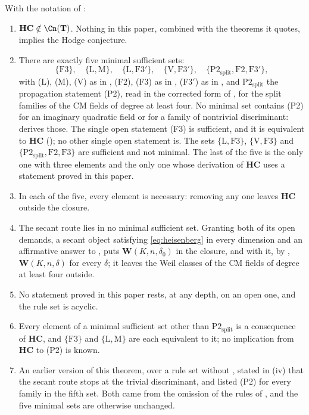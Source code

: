 \begin{theorem}\label{thm:closure}
With the notation of :
\begin{enumerate}[label=\textup{(\roman*)},leftmargin=2.6em]
\item $\mathbf{HC}\notin\Cn(\mathbf{T})$. Nothing in this paper, combined with the
  theorems it quotes, implies the Hodge conjecture.
\item There are exactly five minimal sufficient sets:
  \[
    \{\mathrm{F3}\},\quad\{\mathrm{L},\mathrm{M}\},\quad
    \{\mathrm{L},\mathrm{F3}'\},\quad\{\mathrm{V},\mathrm{F3}'\},\quad
    \{\mathrm{P2}_{\mathrm{split}},\mathrm{F2},\mathrm{F3}'\},
  \]
  with \textup{(L)}, \textup{(M)}, \textup{(V)} as in ,
  \textup{(F2)}, \textup{(F3)} as in , (F3$'$) as in
  , and $\mathrm{P2}_{\mathrm{split}}$ the propagation
  statement \textup{(P2)}, read in the corrected form of ,
  for the split families of the CM fields of degree at least four. No
  minimal set contains \textup{(P2)} for an imaginary quadratic field or for
  a family of nontrivial discriminant:  derives those.
  The single open statement (F3) is sufficient, and it is equivalent to
  $\mathbf{HC}$ (); no other single open statement is.
  The sets $\{\mathrm{L},\mathrm{F3}\}$, $\{\mathrm{V},\mathrm{F3}\}$ and
  $\{\mathrm{P2}_{\mathrm{split}},\mathrm{F2},\mathrm{F3}\}$ are sufficient and
  not minimal. The last of the five is the only one with three elements and the
  only one whose derivation of $\mathbf{HC}$ uses a statement proved in this
  paper.
\item In each of the five, every element is necessary: removing any one
  leaves $\mathbf{HC}$ outside the closure.
\item The secant route lies in no minimal sufficient set. Granting both of its
  open demands, a secant object satisfying \eqref{eq:heisenberg} in every
  dimension and an affirmative answer to \cite[Question 11.4]{Mar25b}, puts
  $\mathbf{W}(K,n,\delta_{0})$ in the closure, and with it, by
  , $\mathbf{W}(K,n,\delta)$ for every $\delta$; it leaves
  the Weil classes of the CM fields of degree at least four outside.
\item No statement proved in this paper rests, at any depth, on an open one,
  and the rule set is acyclic.
\item Every element of a minimal sufficient set other than
  $\mathrm{P2}_{\mathrm{split}}$ is a consequence of $\mathbf{HC}$, and $\{\mathrm{F3}\}$ and
  $\{\mathrm{L},\mathrm{M}\}$ are each equivalent to it; no implication from
  $\mathbf{HC}$ to \textup{(P2)} is known.
\item An earlier version of this theorem, over a rule set without
  , stated in (iv) that the secant route stops at the
  trivial discriminant, and listed \textup{(P2)} for every family in the
  fifth set. Both came from the omission of the rules of
  , and the five minimal sets are otherwise unchanged.
\end{enumerate}
\end{theorem}

